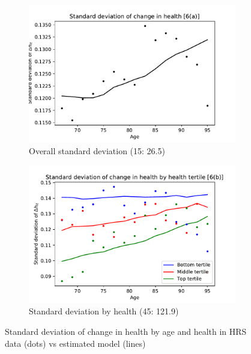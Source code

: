 \documentclass[12pt,pdftex,letterpaper]{article}
\begin{document}
\begin{figure}[h!]
    \centering
    \begin{subfigure}[b]{0.49\textwidth}
        \centering
        \includegraphics[width=\textwidth]{../Figures/StDevDeltaHealthByAge.pdf}
        \caption{Overall standard deviation (15: 26.5)}
    \end{subfigure}
    \begin{subfigure}[b]{0.49\textwidth}
        \centering
        \includegraphics[width=\textwidth]{../Figures/StDevDeltaHealthByHealthAge.pdf}
        \caption{Standard deviation by health (45: 121.9)}
    \end{subfigure}
    \caption{Standard deviation of change in health by age and health in HRS data (dots) vs estimated model (lines)}
    \label{fig:MomentCat6}
\end{figure}
\end{document}
